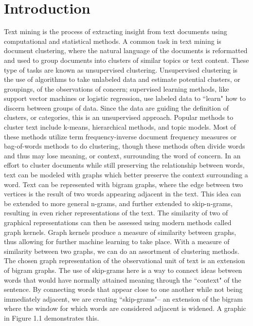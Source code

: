 %
%
%

\chapter{Introduction}
\label{introduction}


\hspace*{0.3cm} Text mining is the process of extracting insight from text documents using computational and statistical methods. A common task in text mining is document clustering, where the natural language of the documents is reformatted and used to group documents into clusters of similar topics or text content. These type of tasks are known as unsupervised clustering. Unsupervised clustering is the use of algorithms to take unlabeled data and estimate potential clusters, or groupings, of the observations of concern; supervised learning methods, like support vector machines or logistic regression, use labeled data to ``learn" how to discern between groups of data. Since the data are guiding the definition of clusters, or categories, this is an unsupervised approach. Popular methods to cluster text include k-means, hierarchical methods, and topic models. Most of these methods utilize term frequency-inverse document frequency measures  or bag-of-words methods to do clustering, though these methods often divide words and thus may lose meaning, or context, surrounding the word of concern. In an effort to cluster documents while still preserving the relationship between words, text can be modeled with graphs which better preserve the context surrounding a word. Text can be represented with bigram graphs, where the edge between two vertices is the result of two words appearing adjacent in the text. This idea can be extended to more general n-grams, and further extended to skip-n-grams, resulting in even richer representations of the text. The similarity of two of graphical representations can then be assessed using modern methods called graph kernels. Graph kernels produce a measure of similarity between graphs, thus allowing for further machine learning to take place. With a measure of similarity between two graphs, we can do an assortment of clustering methods.\\

The chosen graph representation of the observational unit of text is an extension of bigram graphs. The use of skip-grams here is a way to connect ideas between words that would have normally attained meaning through the ``context" of the sentence. By connecting words that appear close to one another while not being immediately adjacent, we are creating ``skip-grams"-- an extension of the bigram where the window for which words are considered adjacent is widened. A graphic in Figure 1.1 demonstrates this.\\

